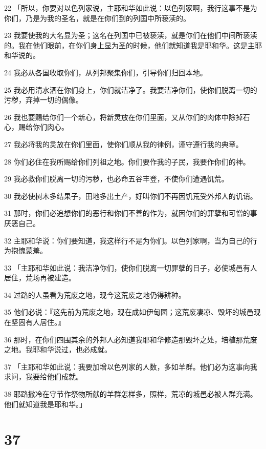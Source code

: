 \par 22 「所以，你要对以色列家说，主耶和华如此说：以色列家啊，我行这事不是为你们，乃是为我的圣名，就是在你们到的列国中所亵渎的。
\par 23 我要使我的大名显为圣；这名在列国中已被亵渎，就是你们在他们中间所亵渎的。我在他们眼前，在你们身上显为圣的时候，他们就知道我是耶和华。这是主耶和华说的。
\par 24 我必从各国收取你们，从列邦聚集你们，引导你们归回本地。
\par 25 我必用清水洒在你们身上，你们就洁净了。我要洁净你们，使你们脱离一切的污秽，弃掉一切的偶像。
\par 26 我也要赐给你们一个新心，将新灵放在你们里面，又从你们的肉体中除掉石心，赐给你们肉心。
\par 27 我必将我的灵放在你们里面，使你们顺从我的律例，谨守遵行我的典章。
\par 28 你们必住在我所赐给你们列祖之地。你们要作我的子民，我要作你们的神。
\par 29 我必救你们脱离一切的污秽，也必命五谷丰登，不使你们遭遇饥荒。
\par 30 我必使树木多结果子，田地多出土产，好叫你们不再因饥荒受外邦人的讥诮。
\par 31 那时，你们必追想你们的恶行和你们不善的作为，就因你们的罪孽和可憎的事厌恶自己。
\par 32 主耶和华说：你们要知道，我这样行不是为你们。以色列家啊，当为自己的行为抱愧蒙羞。
\par 33 「主耶和华如此说：我洁净你们，使你们脱离一切罪孽的日子，必使城邑有人居住，荒场再被建造。
\par 34 过路的人虽看为荒废之地，现今这荒废之地仍得耕种。
\par 35 他们必说：『这先前为荒废之地，现在成如伊甸园；这荒废凄凉、毁坏的城邑现在坚固有人居住。』
\par 36 那时，在你们四围其余的外邦人必知道我耶和华修造那毁坏之处，培植那荒废之地。我耶和华说过，也必成就。
\par 37 「主耶和华如此说：我要加增以色列家的人数，多如羊群。他们必为这事向我求问，我要给他们成就。
\par 38 耶路撒冷在守节作祭物所献的羊群怎样多，照样，荒凉的城邑必被人群充满。他们就知道我是耶和华。」

\chapter{37}

